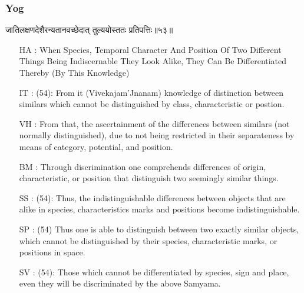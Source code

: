 \begin{frame}[fragile]\frametitle{Yog}
\begin{sanskrit}
जातिलक्षणदेशैरन्यतानवच्छेदात् तुल्ययोस्ततः प्रतिपत्तिः॥५३॥
\end{sanskrit}

	\begin{itemize}
	\item [HA]: When Species, Temporal Character And Position Of Two Different Things Being Indiscernable They Look Alike, They Can Be Differentiated Thereby (By This Knowledge)
	\item [IT]: (54): From it (Vivekajam’Jnanam) knowledge of distinction between similars which cannot be distinguished by class, characteristic or postion.
	\item [VH]: From that, the ascertainment of the differences between similars (not normally distinguished), due to not being restricted in their separateness by means of category, potential, and position.
	\item [BM]: Through discrimination one comprehends differences of origin, characteristic, or position that distinguish two seemingly similar things.
	\item [SS]: (54): Thus, the indistinguishable differences between objects that are alike in species, characteristics marks and positions become indistinguishable.
	\item [SP]: (54) Thus one is able to distinguish between two exactly similar objects, which cannot be distinguished by their species, characteristic marks, or positions in space.
	\item [SV]: (54): Those which cannot be differentiated by species, sign and place, even they will be discriminated by the above Samyama. 
	\end{itemize}
\end{frame}


